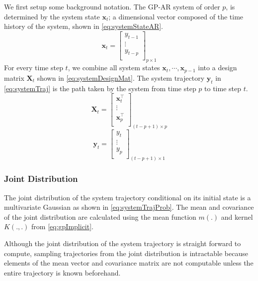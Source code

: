We first setup some background notation. The GP-AR system of order $p$, is determined by the system state 
$\mathbf{x}_t$; a dimensional vector composed of the time history of the system, shown in \cref{eq:systemStateAR}.
%
\begin{equation}\label{eq:systemStateAR}
    \mathbf{x}_t = \begin{bmatrix}
        y_{t-1}\\ 
        \vdots\\ 
        y_{t-p}\\ 
        \end{bmatrix}_{p \times 1}
\end{equation}
%
For every time step $t$, we combine all system states $\mathbf{x}_t, \cdots, \mathbf{x}_{p-1}$ into a design matrix 
$\mathbf{X}_t$ shown in \cref{eq:systemDesignMat}. The system trajectory $\mathbf{y}_t$ in \cref{eq:systemTraj} is the 
path taken by the system from time step $p$ to time step $t$.
%
\begin{equation}\label{eq:systemDesignMat}
    \mathbf{X}_t = \begin{bmatrix}
        \mathbf{x}^{\intercal}_{t}\\ 
        \vdots\\ 
        \mathbf{x}^{\intercal}_{p}\\ 
        \end{bmatrix}_{(t-p+1) \times p}
\end{equation}
%
\begin{equation}\label{eq:systemTraj}
    \mathbf{y}_t = \begin{bmatrix}
        y_{t}\\ 
        \vdots\\ 
        y_{p}\\ 
        \end{bmatrix}_{(t-p+1) \times 1}
\end{equation}

\subsubsection*{Joint Distribution}

The joint distribution of the system trajectory conditional on its initial state is a multivariate Gaussian 
as shown in \cref{eq:systemTrajProb}. The mean and covariance of the joint distribution are calculated using the 
mean function $m(.)$ and kernel $K(., .)$ from \cref{eq:gpImplicit}. 

Although the joint distribution of the system trajectory is straight forward to compute, sampling trajectories from 
the joint distribution is intractable because elements of the mean vector and covariance matrix are not computable 
unless the entire trajectory is known beforehand. 

